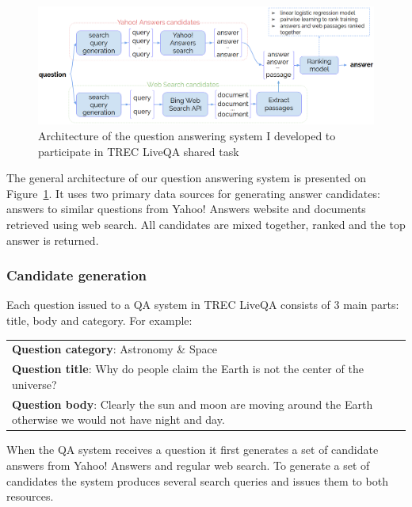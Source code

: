 \begin{figure}
	\includegraphics[width=\textwidth]{img/liveqa_qa_model}
	\caption{Architecture of the question answering system I developed to participate in TREC LiveQA shared task}
	\label{figure:non-factoid:liveqa:qa_model}
\end{figure}

The general architecture of our question answering system is presented on Figure~\ref{figure:non-factoid:liveqa:qa_model}.
It uses two primary data sources for generating answer candidates: answers to similar questions from Yahoo! Answers website and documents retrieved using web search. 
All candidates are mixed together, ranked and the top answer is returned.

\subsubsection{Candidate generation}
\label{section:non-factoid:liveqa:architecture:candidates}

Each question issued to a QA system in TREC LiveQA consists of 3 main parts: title, body and category.
For example:

\vspace{3mm}
\begin{tabular}{|p{15cm}|}
\hline
\textbf{Question category}: Astronomy \& Space\\
\textbf{Question title}: Why do people claim the Earth is not the center of the universe?\\
\textbf{Question body}: Clearly the sun and moon are moving around the Earth otherwise we would not have night and day.\\
\hline
\end{tabular}
\vspace{3mm}

When the QA system receives a question it first generates a set of candidate answers from Yahoo! Answers and regular web search.
To generate a set of candidates the system produces several search queries and issues them to both resources.

